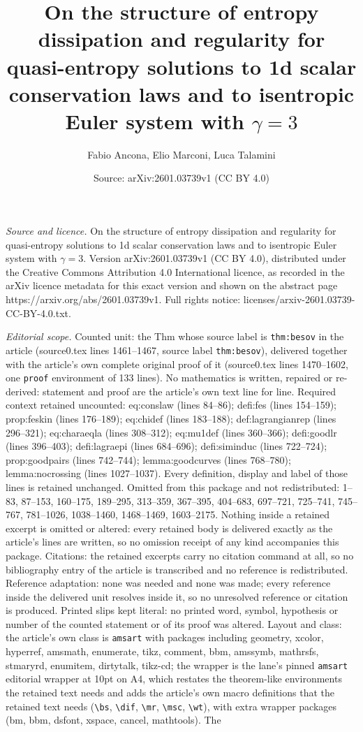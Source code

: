 \documentclass[10pt,a4paper]{amsart}
\title[On the structure of entropy dissipation and regularity for q]{On the structure of entropy dissipation and regularity for quasi-entropy solutions to 1d scalar conservation laws and to isentropic Euler system with $\gamma=3$}
\author{Fabio Ancona, Elio Marconi, Luca Talamini}
\date{Source: arXiv:2601.03739v1 (CC BY 4.0)}
\begin{document}
\maketitle

\noindent\emph{Source and licence.} On the structure of entropy dissipation and regularity for quasi-entropy solutions to 1d scalar conservation laws and to isentropic Euler system with $\gamma=3$. Version arXiv:2601.03739v1 (CC BY 4.0), distributed under the Creative Commons Attribution 4.0 International licence, as recorded in the arXiv licence metadata for this exact version and shown on the abstract page https://arxiv.org/abs/2601.03739v1. Full rights notice: licenses/arxiv-2601.03739-CC-BY-4.0.txt.\par\smallskip

\noindent\textit{Editorial scope.} Counted unit: the Thm whose source label is \texttt{thm:besov} in the article (source0.tex lines 1461--1467, source label \texttt{thm:besov}), delivered together with the article's own complete original proof of it (source0.tex lines 1470--1602, one \texttt{proof} environment of 133 lines). No mathematics is written, repaired or re-derived: statement and proof are the article's own text line for line. Required context retained uncounted: eq:conslaw (lines 84--86); defi:fes (lines 154--159); prop:feskin (lines 176--189); eq:chidef (lines 183--188); def:lagrangianrep (lines 296--321); eq:charaeqla (lines 308--312); eq:mu1def (lines 360--366); defi:goodlr (lines 396--403); defi:lagraepi (lines 684--696); defi:siminduc (lines 722--724); prop:goodpairs (lines 742--744); lemma:goodcurves (lines 768--780); lemma:nocrossing (lines 1027--1037). Every definition, display and label of those lines is retained unchanged. Omitted from this package and not redistributed: 1--83, 87--153, 160--175, 189--295, 313--359, 367--395, 404--683, 697--721, 725--741, 745--767, 781--1026, 1038--1460, 1468--1469, 1603--2175. Nothing inside a retained excerpt is omitted or altered: every retained body is delivered exactly as the article's lines are written, so no omission receipt of any kind accompanies this package. Citations: the retained excerpts carry no citation command at all, so no bibliography entry of the article is transcribed and no reference is redistributed. Reference adaptation: none was needed and none was made; every reference inside the delivered unit resolves inside it, so no unresolved reference or citation is produced. Printed slips kept literal: no printed word, symbol, hypothesis or number of the counted statement or of its proof was altered. Layout and class: the article's own class is \texttt{amsart} with packages including geometry, xcolor, hyperref, amsmath, enumerate, tikz, comment, bbm, amssymb, mathrsfs, stmaryrd, enumitem, dirtytalk, tikz-cd; the wrapper is the lane's pinned \texttt{amsart} editorial wrapper at 10pt on A4, which restates the theorem-like environments the retained text needs and adds the article's own macro definitions that the retained text needs (\texttt{\textbackslash bs}, \texttt{\textbackslash dif}, \texttt{\textbackslash mr}, \texttt{\textbackslash msc}, \texttt{\textbackslash wt}), with extra wrapper packages (bm, bbm, dsfont, xspace, cancel, mathtools). The 
\end{document}
